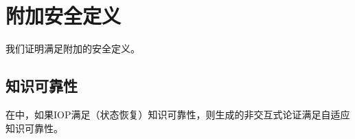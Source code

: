 \documentclass[american,singlepageview]{snargs-book-zh}
\begin{document}
\chapter{附加安全定义}
\label{chapter:bcs-additional}

我们证明满足附加的安全定义。

\section{知识可靠性}
\label{section:bcs-knowledge-soundness}

在中，如果IOP满足（状态恢复）知识可靠性，则生成的非交互式论证满足自适应知识可靠性。
\end{document}
